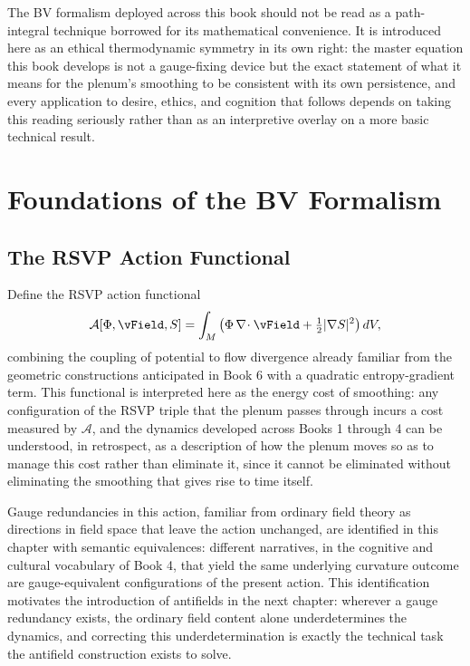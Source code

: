 The BV formalism deployed across this book should not be read as a path-integral technique borrowed for its mathematical convenience. It is introduced here as an ethical thermodynamic symmetry in its own right: the master equation this book develops is not a gauge-fixing device but the exact statement of what it means for the plenum's smoothing to be consistent with its own persistence, and every application to desire, ethics, and cognition that follows depends on taking this reading seriously rather than as an interpretive overlay on a more basic technical result.

\part{Foundations of the BV Formalism}

\chapter{The RSVP Action Functional}

Define the RSVP action functional
\[
\mathcal{A}[\PhiField, \vField, \SEntropy] = \int_M \left( \PhiField \, \diverg \vField + \tfrac{1}{2} |\grad \SEntropy|^2 \right) dV,
\]
combining the coupling of potential to flow divergence already familiar from the geometric constructions anticipated in Book 6 with a quadratic entropy-gradient term. This functional is interpreted here as the energy cost of smoothing: any configuration of the RSVP triple that the plenum passes through incurs a cost measured by $\mathcal{A}$, and the dynamics developed across Books 1 through 4 can be understood, in retrospect, as a description of how the plenum moves so as to manage this cost rather than eliminate it, since it cannot be eliminated without eliminating the smoothing that gives rise to time itself.

Gauge redundancies in this action, familiar from ordinary field theory as directions in field space that leave the action unchanged, are identified in this chapter with semantic equivalences: different narratives, in the cognitive and cultural vocabulary of Book 4, that yield the same underlying curvature outcome are gauge-equivalent configurations of the present action. This identification motivates the introduction of antifields in the next chapter: wherever a gauge redundancy exists, the ordinary field content alone underdetermines the dynamics, and correcting this underdetermination is exactly the technical task the antifield construction exists to solve.

